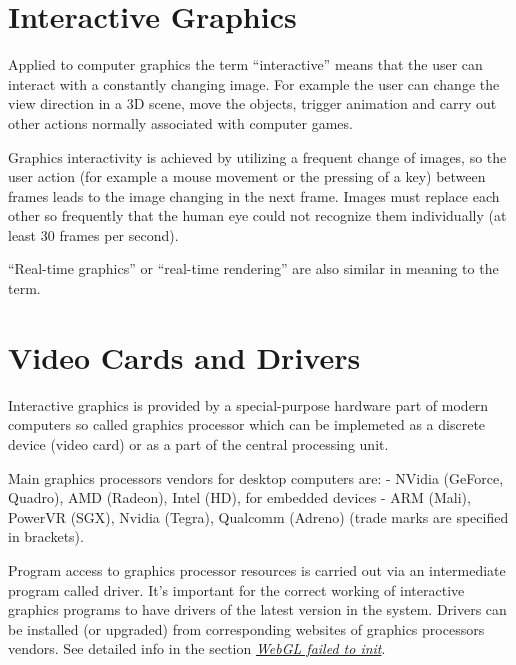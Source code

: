 \documentclass[a4paper,12pt,oneside]{sphinxmanual}
\begin{document}

\section{Interactive Graphics}
\label{about:about-interactive-graphics}\label{about:id12}\label{about:index-9}
Applied to computer graphics the term ``interactive'' means that the user can interact with a constantly changing image. For example the user can change the view direction in a 3D scene, move the objects, trigger animation and carry out other actions normally associated with computer games.

Graphics interactivity is achieved by utilizing a frequent change of images, so the user action (for example a mouse movement or the pressing of a key) between frames leads to the image changing in the next frame. Images must replace each other so frequently that the human eye could not recognize them individually (at least 30 frames per second).

``Real-time graphics'' or ``real-time rendering'' are also similar in meaning to the term.


\section{Video Cards and Drivers}
\label{about:id13}\label{about:about-drivers-video-cards}\label{about:index-10}
Interactive graphics is provided by a special-purpose hardware part of modern computers so called graphics processor which can be implemeted as a discrete device (video card) or as a part of the central processing unit.

Main graphics processors vendors for desktop computers are:  - NVidia (GeForce, Quadro), AMD (Radeon), Intel (HD), for embedded devices - ARM (Mali), PowerVR (SGX), Nvidia (Tegra), Qualcomm (Adreno) (trade marks are specified in brackets).

Program access to graphics processor resources is carried out via an intermediate program called driver. It's important for the correct working of interactive graphics programs to have drivers of the latest version in the system. Drivers can be installed (or upgraded) from corresponding websites of graphics processors vendors. See detailed info in the section {\hyperref[problems_and_solutions:webgl-not-working]{\emph{WebGL failed to init}}}.

\end{document}
